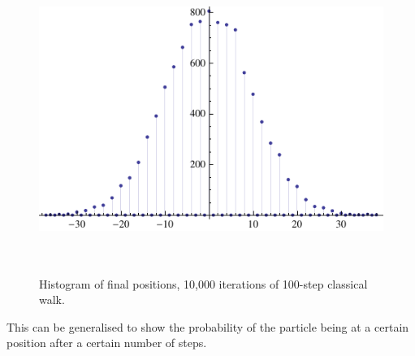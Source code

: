 \documentclass[a0,portrait]{a0poster}
\begin{document}
\begin{center}
{\begin{figure}
\includegraphics[height=100mm]{classic-10k-of-100-itterations.pdf}
\caption{Histogram of final positions, 10,000 iterations of 100-step classical walk.}
\label{clas_10k}
\end{figure}    

This can be generalised to show the probability of the particle being at a certain position after a certain number of steps\cite{Ke:2003}.

}
\end{center}
\end{document}
